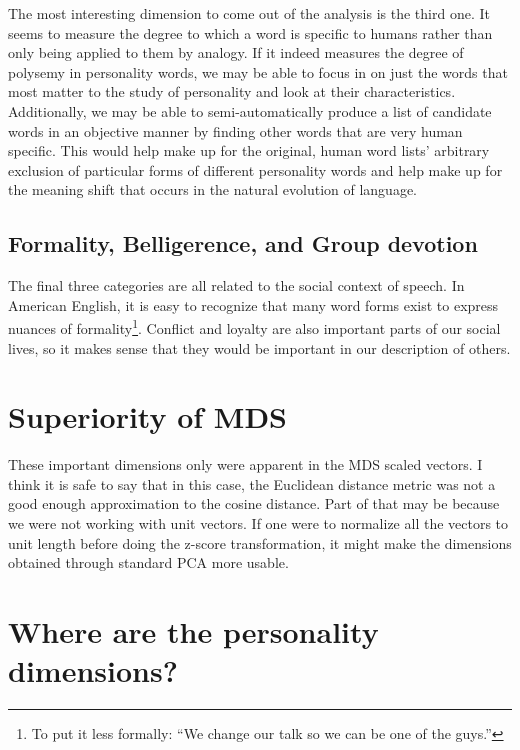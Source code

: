 The most interesting dimension to come out of the analysis is the third one.
It seems to measure the degree to which a word is specific to humans rather than
only being applied to them by analogy. 
If it indeed measures the degree of polysemy in personality words, we may be 
able to focus in on just the words that most matter to the study of personality
and look at their characteristics. Additionally, we may be able to 
semi-automatically produce a list of candidate words in an objective manner by
finding other words that are very human specific. This would help make up for
the original, human word lists' arbitrary exclusion of particular forms of 
different
personality words and help make up for the meaning shift that occurs in the 
natural evolution of language.

\subsection{Formality, Belligerence, and Group devotion}

The final three categories are all related to the social context of speech. In
American English, it is easy to recognize that many word forms exist to express
nuances of formality\footnote{To put it less formally: ``We change our
talk so we can be one of the guys.''}. Conflict and loyalty are also important
parts of our social lives, so it makes sense that they would be important in
our description of others.

\section{Superiority of MDS}

These important dimensions only were apparent in the MDS scaled vectors. I think
it is safe to say that in this case, the Euclidean distance metric was not a
good enough approximation to the cosine distance. Part of that may be because
we were not working with unit vectors. If one were to normalize all the vectors 
to unit length before doing the z-score transformation, it might make the 
dimensions obtained through standard PCA more usable.

\section{Where are the personality dimensions?}

